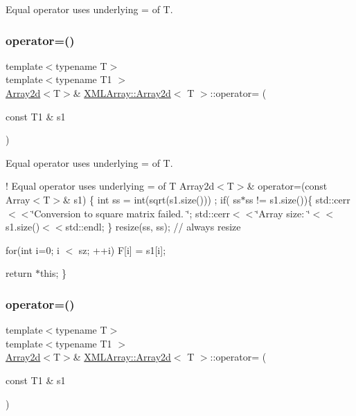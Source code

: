 Equal operator uses underlying = of T. 

\mbox{\label{classXMLArray_1_1Array2d_a2ac560b13ec78975a0cab0b2dcbfe72f}} 
\subsubsection{\texorpdfstring{operator=()}{operator=()}\hspace{0.1cm}{\footnotesize\ttfamily [4/6]}}
{\footnotesize\ttfamily template$<$typename T$>$ \\
template$<$typename T1 $>$ \\
\mbox{\hyperlink{classXMLArray_1_1Array2d}{Array2d}}$<$T$>$\& \mbox{\hyperlink{classXMLArray_1_1Array2d}{X\+M\+L\+Array\+::\+Array2d}}$<$ T $>$\+::operator= (\begin{DoxyParamCaption}\item[{const T1 \&}]{s1 }\end{DoxyParamCaption})\hspace{0.3cm}{\ttfamily [inline]}}



Equal operator uses underlying = of T. 

! Equal operator uses underlying = of T Array2d$<$\+T$>$\& operator=(const Array$<$\+T$>$\& s1) \{ int ss = int(sqrt(s1.\+size())) ; if( ss$\ast$ss != s1.\+size())\{ std\+::cerr$<$$<$\char`\"{}\+Conversion to square matrix failed. \char`\"{}; std\+::cerr$<$$<$\char`\"{}\+Array size\+: \char`\"{}$<$$<$s1.\+size()$<$$<$std\+::endl; \} resize(ss, ss); // always resize

for(int i=0; i $<$ sz; ++i) F\mbox{[}i\mbox{]} = s1\mbox{[}i\mbox{]};

return $\ast$this; \} \mbox{\label{classXMLArray_1_1Array2d_a2ac560b13ec78975a0cab0b2dcbfe72f}} 
\subsubsection{\texorpdfstring{operator=()}{operator=()}\hspace{0.1cm}{\footnotesize\ttfamily [5/6]}}
{\footnotesize\ttfamily template$<$typename T$>$ \\
template$<$typename T1 $>$ \\
\mbox{\hyperlink{classXMLArray_1_1Array2d}{Array2d}}$<$T$>$\& \mbox{\hyperlink{classXMLArray_1_1Array2d}{X\+M\+L\+Array\+::\+Array2d}}$<$ T $>$\+::operator= (\begin{DoxyParamCaption}\item[{const T1 \&}]{s1 }\end{DoxyParamCaption})\hspace{0.3cm}{\ttfamily [inline]}}



